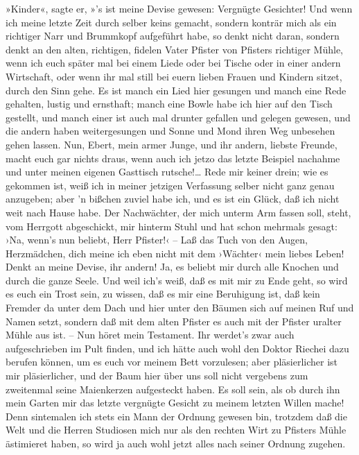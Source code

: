 »Kinder«, sagte er, »'s ist meine Devise gewesen: Vergnügte
Gesichter! Und wenn ich meine letzte Zeit durch selber keins
gemacht, sondern konträr mich als ein richtiger Narr und Brummkopf
aufgeführt habe, so denkt nicht daran, sondern denkt an den alten,
richtigen, fidelen Vater Pfister von Pfisters richtiger Mühle, wenn
ich euch später mal bei einem Liede oder bei Tische oder in einer
andern Wirtschaft, oder wenn ihr mal still bei euern lieben Frauen
und Kindern sitzet, durch den Sinn gehe. Es ist manch ein Lied hier
gesungen und manch eine Rede gehalten, lustig und ernsthaft; manch
eine Bowle habe ich hier auf den Tisch gestellt, und manch einer
ist auch mal drunter gefallen und gelegen gewesen, und die andern
haben weitergesungen und Sonne und Mond ihren Weg unbesehen gehen
lassen. Nun, Ebert, mein armer Junge, und ihr andern, liebste
Freunde, macht euch gar nichts draus, wenn auch ich jetzo das
letzte Beispiel nachahme und unter meinen eigenen Gasttisch
rutsche!\ldots{} Rede mir keiner drein; wie es gekommen ist, weiß ich in
meiner jetzigen Verfassung selber nicht ganz genau anzugeben; aber
'n bißchen zuviel habe ich, und es ist ein Glück, daß ich nicht
weit nach Hause habe. Der Nachwächter, der mich unterm Arm fassen
soll, steht, vom Herrgott abgeschickt, mir hinterm Stuhl und hat
schon mehrmals gesagt: ›Na, wenn's nun beliebt, Herr Pfister!‹ –
Laß das Tuch von den Augen, Herzmädchen, dich meine ich eben nicht
mit dem ›Wächter‹ mein liebes Leben! Denkt an meine Devise, ihr
andern! Ja, es beliebt mir durch alle Knochen und durch die ganze
Seele. Und weil ich's weiß, daß es mit mir zu Ende geht, so wird es
euch ein Trost sein, zu wissen, daß es mir eine Beruhigung ist, daß
kein Fremder da unter dem Dach und hier unter den Bäumen sich auf
meinen Ruf und Namen setzt, sondern daß mit dem alten Pfister es
auch mit der Pfister uralter Mühle aus ist. – Nun höret mein
Testament. Ihr werdet's zwar auch aufgeschrieben im Pult finden,
und ich hätte auch wohl den Doktor Riechei dazu berufen können, um
es euch vor meinem Bett vorzulesen; aber pläsierlicher ist mir
pläsierlicher, und der Baum hier über uns soll nicht vergebens zum
zweitenmal seine Maienkerzen aufgesteckt haben. Es soll sein, als
ob durch ihn mein Garten mir das letzte vergnügte Gesicht zu meinem
letzten Willen mache! Denn sintemalen ich stets ein Mann der
Ordnung gewesen bin, trotzdem daß die Welt und die Herren Studiosen
mich nur als den rechten Wirt zu Pfisters Mühle ästimieret haben,
so wird ja auch wohl jetzt alles nach seiner Ordnung zugehen.

